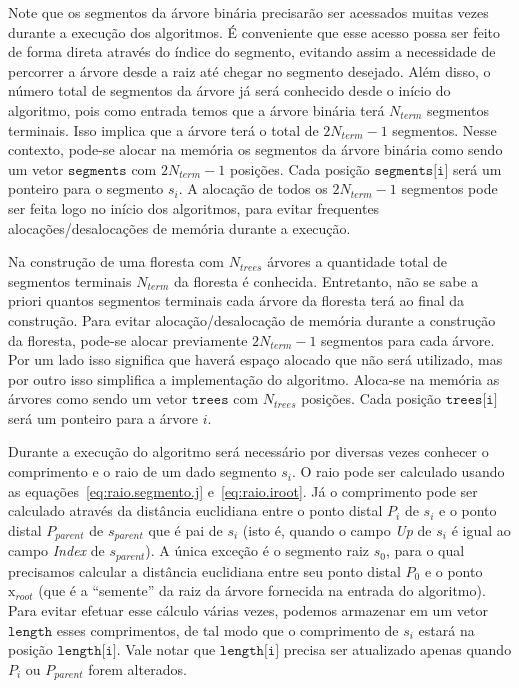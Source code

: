 \begin{apendices}
Note que os segmentos da árvore binária precisarão ser acessados muitas vezes durante
a execução dos algoritmos. É conveniente que esse acesso possa ser feito de
forma direta através do índice do segmento, evitando assim a necessidade de percorrer a árvore
desde a raiz até chegar no segmento desejado. Além disso, o número total de segmentos da 
árvore já será conhecido desde o início do algoritmo, pois como entrada temos que a árvore 
binária terá $N_{term}$ segmentos terminais. Isso implica que a árvore terá o total de $2N_{term} - 1$
segmentos. Nesse contexto, pode-se alocar na memória os segmentos da árvore binária  
como sendo um vetor $\texttt{segments}$ com $2N_{term} - 1$ posições. Cada posição $\texttt{segments[i]}$ será um ponteiro 
para o segmento $s_i$. A alocação de todos os $2N_{term} - 1$ segmentos pode ser feita logo no início
dos algoritmos, para evitar frequentes alocações/desalocações de memória durante a execução.

Na construção de uma floresta com $N_{trees}$ árvores a quantidade total de segmentos terminais $N_{term}$ 
da floresta é conhecida. Entretanto, não se sabe a priori quantos segmentos terminais cada árvore da floresta 
terá ao final da construção. Para evitar alocação/desalocação de memória durante a construção da floresta, 
pode-se alocar previamente $2N_{term} - 1$ segmentos para cada árvore. Por um lado isso significa 
que haverá espaço alocado que não será utilizado, mas por outro isso simplifica a implementação do algoritmo. 
Aloca-se na memória as árvores como sendo um vetor $\texttt{trees}$ com $N_{trees}$ posições.
Cada posição $\texttt{trees[i]}$ será um ponteiro para a árvore $i$.

Durante a execução do algoritmo será necessário por diversas vezes conhecer o comprimento e o raio 
de um dado segmento $s_i$. O raio pode ser calculado usando as equações~\eqref{eq:raio.segmento.j} e~\eqref{eq:raio.iroot}.
Já o comprimento pode ser calculado através da distância euclidiana entre
o ponto distal $P_i$ de $s_i$ e o ponto distal $P_{parent}$ de $s_{parent}$ que é pai de 
$s_i$ (isto é, quando o campo \textit{Up} de $s_i$ é igual ao campo \textit{Index} de $s_{parent}$). 
A única exceção é o segmento raiz $s_0$, para o qual precisamos calcular a distância euclidiana entre 
seu ponto distal $P_0$ e o ponto $\mathrm{x}_{root}$ (que é a ``semente'' da raiz da árvore fornecida
na entrada do algoritmo). 
Para evitar efetuar esse cálculo várias vezes, podemos armazenar em um vetor $\texttt{length}$ 
esses comprimentos, de tal modo que o comprimento de $s_i$ estará na posição $\texttt{length[i]}$.
Vale notar que $\texttt{length[i]}$ precisa ser atualizado apenas quando $P_i$ ou $P_{parent}$ forem 
alterados.


\end{apendices}
